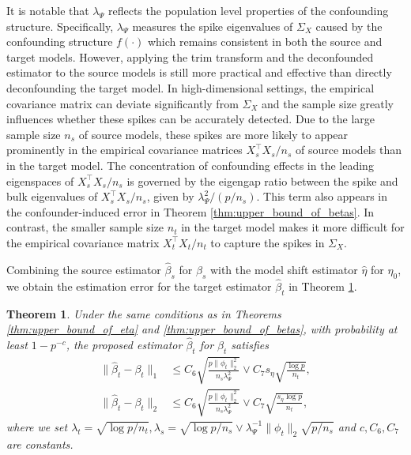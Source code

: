 \documentclass[12pt]{article}
\newtheorem{thm}{Theorem}
\begin{document}
It is notable that $\lambda_\Psi$ reflects the population level properties of the confounding structure. Specifically, $\lambda_\Psi$ measures the spike eigenvalues of $\Sigma_X$ caused by the confounding structure $f(\cdot)$ which remains consistent in both the source and target models. However, applying the trim transform and the deconfounded estimator to the source models is still more practical and effective than directly deconfounding the target model. In high-dimensional settings, the empirical covariance matrix can deviate significantly from $\Sigma_X$ and the sample size greatly influences whether these spikes can be accurately detected. Due to the large sample size $n_s$ of source models, these spikes are more likely to appear prominently in the empirical covariance matrices $X_s^\top X_s/n_s$ of source models than in the target model. The concentration of confounding effects in the leading eigenspaces of $X_s^\top X_s/n_s$ is governed by the eigengap ratio between the spike and bulk eigenvalues of $X_s^\top X_s/n_s$, given by $\lambda_\Psi^2/(p/n_s)$. This term also appears in the confounder-induced error in Theorem  \ref{thm:upper_bound_of_betas}. In contrast, the smaller sample size $n_t$ in the target model makes it more difficult for the empirical covariance matrix $X_t^\top X_t/n_t$ to capture the spikes in $\Sigma_X$. 

Combining the source estimator $\hat{\beta}_s$ for $\beta_s$ with the model shift estimator $\hat{\eta}$ for $\eta_0$, we obtain the estimation error for the target estimator $\hat{\beta}_t$ in Theorem \ref{thm:upper_bound_of_betat}. 

\begin{thm}
    \label{thm:upper_bound_of_betat}
    Under the same conditions as in Theorems \ref{thm:upper_bound_of_eta} and \ref{thm:upper_bound_of_betas}, with probability at least $1-p^{-c}$, the proposed estimator $\hat{\beta}_t$ for $\beta_t$ satisfies
         \begin{align*}
            \|\hat{\beta}_t - \beta_t\|_1  &\le  C_6 \sqrt{\frac{p\|\phi_t\|_2^2}{n_s\lambda_\Psi^2}} \vee C_7 s_\eta\sqrt{\frac{\log p}{n_t}},\\
            \|\hat{\beta}_t - \beta_t\|_2  &\le  C_6 \sqrt{\frac{p\|\phi_t\|_2^2}{n_s\lambda_\Psi^2}} \vee C_7\sqrt{\frac{ s_\eta\log p}{n_t}},
        \end{align*}
        where we set $\lambda_t=\sqrt{\log p/n_t},\lambda_s = \sqrt{\log p/n_s}\vee \lambda_\Psi^{-1}\|\phi_t\|_2\sqrt{p/n_s}$ and $c,C_6,C_7$ are constants. 
\end{thm}
\end{document}
